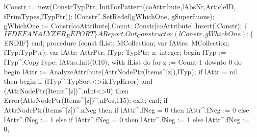    lConstr :=  new(ConstrTypPtr,
                   InitForPattern(coAttribute,lAbsNr,ArticleID,
                                  fPrimTypes,lTypPtr));
   lConstr^.SetRedef(gWhichOne, gSuperfluous);
   gWhichOne :=  Constr[coAttribute].Count;
   Constr[coAttribute].Insert(lConstr);
   \{$IFDEF ANALYZER_REPORT\}
   AReport.Out_Constructor(lConstr, gWhichOne);
   \{$ENDIF\}
end;
\eatline
{}\nwendcode{}\nwdocspar
\nwenddocs{}\endmoddef\nwstartdeflinemarkup{}\nwenddeflinemarkup
procedure (const fList: MCollection;
                         var fAttrs: MCollection;
                         fTyp:TypPtr);
var
   lAttr: AttrPtr;
   lTyp: TypPtr;
   z: integer;
begin
   lTyp := fTyp^.CopyType;
   fAttrs.Init(0,10);
   with fList do
      for z := Count-1 downto 0 do
      begin
         lAttr := AnalyzeAttribute(AttrNodePtr(Items^[z]),lTyp);
         if lAttr = nil then
         begin
            if (lTyp^.TypSort<>ikTypError) and (AttrNodePtr(Items^[z])^.nInt<>0) then
               Error(AttrNodePtr(Items^[z])^.nPos,115);
            exit;
         end;
         if AttrNodePtr(Items^[z])^.nNeg then
            if lAttr^.fNeg = 0 then
               lAttr^.fNeg := 0
            else lAttr^.fNeg := 1
            else if lAttr^.fNeg = 0 then
               lAttr^.fNeg := 1
            else lAttr^.fNeg := 0;
